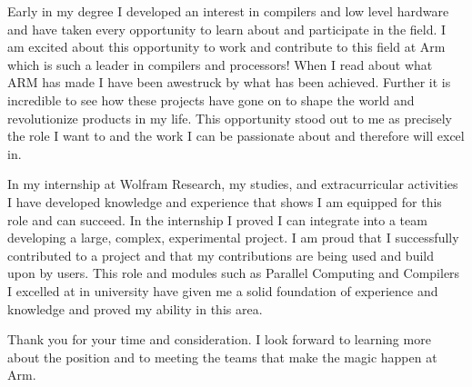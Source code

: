 \documentclass[11pt, a4paper]{awesome-cv} %
\begin{document}
\makecvheader %

\makelettertitle %


\begin{cvletter}

Early in my degree I developed an interest in compilers and low level hardware and have taken every opportunity to 
learn about and participate in the field. I am excited about this opportunity to work and contribute to 
this field at Arm which is such a leader in compilers and processors! When I read about what ARM has made 
I have been awestruck by what has been achieved. 
Further it is incredible to see how these projects have gone on to shape the world and revolutionize products in my life.
This opportunity stood out to me as precisely the role I want to and the work I can be passionate about and therefore will excel in.

In my internship at Wolfram Research, my studies, and extracurricular activities I have developed knowledge and 
experience that shows I am equipped for this role and can succeed.
In the internship I proved I can integrate into a team
developing a large, complex, experimental project. I am proud that I successfully contributed to a 
project and that my contributions are being used and build upon by users.
This role and modules such as Parallel Computing and Compilers I excelled at in university have given me
a solid foundation of experience and knowledge and proved my ability in this area.

Thank you for your time and consideration. I look forward to learning more about the position and 
to meeting the teams that make the magic happen at Arm.


\end{cvletter}


\makeletterclosing %
\end{document}
